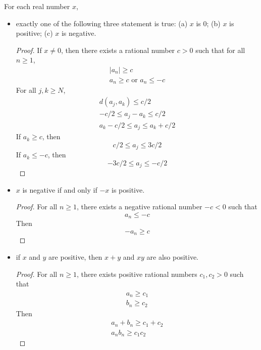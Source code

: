 \documentclass{blog}
\begin{document}
\begin{proposition}
  \label{PROP:PROPERTIES_OF_POSITIVE_REALS}
  For each real number $x$,
  \begin{itemize}
  \item exactly one of the following three statement is true:
    (a) $x$ is 0;
    (b) $x$ is positive;
    (c) $x$ is negative.
    \begin{proof}
      If $x \neq 0$, then there exists a rational number $c > 0$ such that for all $n \geq 1$,
      \begin{gather*}
        |a_{n}| \geq c \\
        a_{n} \geq c \text{ or } a_{n} \leq -c
      \end{gather*}
      For all $j, k \geq N$,
      \begin{gather*}
        d(a_{j}, a_{k}) \leq c / 2 \\
        -c / 2 \leq a_{j} - a_{k} \leq c / 2 \\
        a_{k} - c / 2 \leq a_{j} \leq a_{k} + c / 2
      \end{gather*}
      If $a_{k} \geq c$, then
      \begin{equation*}
        c / 2 \leq a_{j} \leq 3 c / 2
      \end{equation*}
      If $a_{k} \leq - c$, then
      \begin{equation*}
        - 3 c / 2 \leq a_{j} \leq - c / 2
      \end{equation*}
    \end{proof}
  \item $x$ is negative if and only if $-x$ is positive.
    \begin{proof}
      For all $n \geq 1$, there exists a negative rational number $-c < 0$ such that
      \begin{equation*}
        a_{n} \leq -c
      \end{equation*}
      Then
      \begin{equation*}
        -a_{n} \geq c
      \end{equation*}
    \end{proof}
  \item if $x$ and $y$ are positive, then $x + y$ and $x y$ are also positive.
    \begin{proof}
      For all $n \geq 1$, there exists positive rational numbers $c_{1}, c_{2} > 0$ such that
      \begin{gather*}
        a_{n} \geq c_{1} \\
        b_{n} \geq c_{2}
      \end{gather*}
      Then
      \begin{gather*}
        a_{n} + b_{n} \geq c_{1} + c_{2} \\
        a_{n} b_{n} \geq c_{1} c_{2}
      \end{gather*}
    \end{proof}
  \end{itemize}
\end{proposition}
\end{document}
